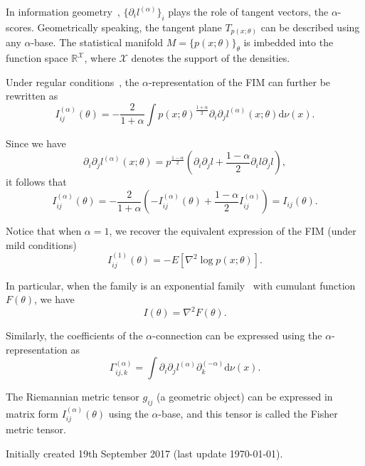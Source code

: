 \documentclass[11pt]{article}
\def\dnu{\mathrm{d}\nu}
\def\calX{\mathcal{X}}
\def\bbR{\mathbb{R}}
\begin{document}
In information geometry~\cite{IG-2014}, $\{\partial_i l^{(\alpha)}\}_i$ plays the role of tangent vectors, the $\alpha$-scores.
Geometrically speaking, the tangent plane $T_{p(x;\theta)}$ can be described using any $\alpha$-base. 
The statistical manifold $M=\{p(x;\theta)\}_\theta$ is imbedded into the function space $\bbR^{\calX}$, where $\calX$ denotes the support of the densities.



Under regular conditions~\cite{CR-2013,IG-2014}, the $\alpha$-representation of the FIM can further be rewritten as
$$
I_{ij}^{(\alpha)}(\theta)=  -\frac{2}{1+\alpha} \int p(x;\theta)^{\frac{1+\alpha}{2}} \partial_i\partial_j l^{(\alpha)}(x;\theta)\dnu(x).
$$

Since we have 
$$
 \partial_i\partial_j l^{(\alpha)}(x;\theta) = p^{\frac{1-\alpha}{2}}\left(
\partial_i\partial_j l + \frac{1-\alpha}{2} \partial_i l\partial_j l
 \right),
$$
it follows that 
$$
I_{ij}^{(\alpha)}(\theta)= -\frac{2}{1+\alpha} \left(-I_{ij}^{(\alpha)}(\theta)+ \frac{1-\alpha}{2} I_{ij}^{(\alpha)}\right)=I_{ij}(\theta).
$$


Notice that when $\alpha=1$, we recover the equivalent expression of the FIM (under mild conditions)
$$
I_{ij}^{(1)}(\theta)= -E[\nabla^2 \log p(x;\theta)].
$$

In particular, when the family is an exponential family~\cite{EF-2009} with cumulant function $F(\theta)$, we have
$$
I(\theta)=\nabla^2 F(\theta).
$$

Similarly, the coefficients of the $\alpha$-connection can be expressed using the $\alpha$-representation as
$$
\Gamma_{ij,k}^{(\alpha)}= \int \partial_i\partial_j l^{(\alpha)}\partial_k^{(-\alpha)} \dnu(x).
$$

The Riemannian metric tensor $g_{ij}$ (a geometric object) can be expressed 
in matrix form $I_{ij}^{(\alpha)}(\theta)$ using the $\alpha$-base, and this tensor is called the Fisher metric tensor.


\vskip 1cm
Initially created 19th September 2017 (last update \today).



\end{document}
